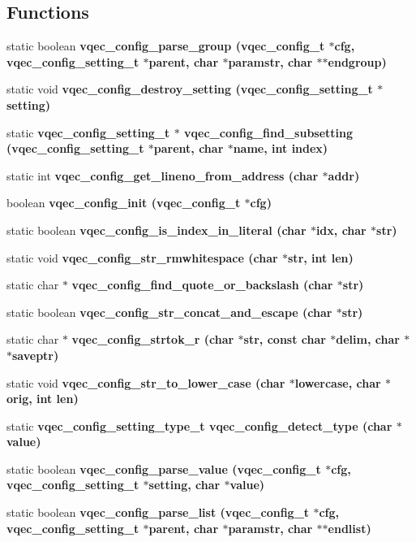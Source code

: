 \subsection*{Functions}
\begin{CompactItemize}
\item 
static boolean \bf{vqec\_\-config\_\-parse\_\-group} (\bf{vqec\_\-config\_\-t} $\ast$cfg, \bf{vqec\_\-config\_\-setting\_\-t} $\ast$parent, char $\ast$paramstr, char $\ast$$\ast$endgroup)
\item 
static void \bf{vqec\_\-config\_\-destroy\_\-setting} (\bf{vqec\_\-config\_\-setting\_\-t} $\ast$setting)
\item 
static \bf{vqec\_\-config\_\-setting\_\-t} $\ast$ \bf{vqec\_\-config\_\-find\_\-subsetting} (\bf{vqec\_\-config\_\-setting\_\-t} $\ast$parent, char $\ast$name, int index)
\item 
static int \bf{vqec\_\-config\_\-get\_\-lineno\_\-from\_\-address} (char $\ast$addr)
\item 
boolean \bf{vqec\_\-config\_\-init} (\bf{vqec\_\-config\_\-t} $\ast$cfg)
\item 
static boolean \bf{vqec\_\-config\_\-is\_\-index\_\-in\_\-literal} (char $\ast$idx, char $\ast$str)
\item 
static void \bf{vqec\_\-config\_\-str\_\-rmwhitespace} (char $\ast$str, int len)
\item 
static char $\ast$ \bf{vqec\_\-config\_\-find\_\-quote\_\-or\_\-backslash} (char $\ast$str)
\item 
static boolean \bf{vqec\_\-config\_\-str\_\-concat\_\-and\_\-escape} (char $\ast$str)
\item 
static char $\ast$ \bf{vqec\_\-config\_\-strtok\_\-r} (char $\ast$str, const char $\ast$delim, char $\ast$$\ast$saveptr)
\item 
static void \bf{vqec\_\-config\_\-str\_\-to\_\-lower\_\-case} (char $\ast$lowercase, char $\ast$orig, int len)
\item 
static \bf{vqec\_\-config\_\-setting\_\-type\_\-t} \bf{vqec\_\-config\_\-detect\_\-type} (char $\ast$value)
\item 
static boolean \bf{vqec\_\-config\_\-parse\_\-value} (\bf{vqec\_\-config\_\-t} $\ast$cfg, \bf{vqec\_\-config\_\-setting\_\-t} $\ast$setting, char $\ast$value)
\item 
static boolean \bf{vqec\_\-config\_\-parse\_\-list} (\bf{vqec\_\-config\_\-t} $\ast$cfg, \bf{vqec\_\-config\_\-setting\_\-t} $\ast$parent, char $\ast$paramstr, char $\ast$$\ast$endlist)
\item 
$$
\end{CompactItemize}
